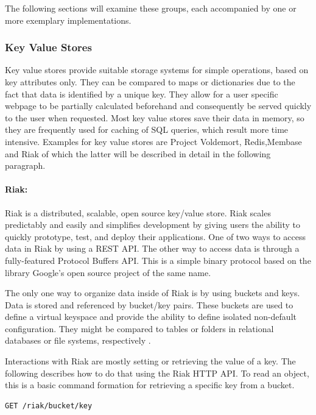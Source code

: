 The following sections will examine these groups, each accompanied by one or more exemplary implementations.      

\subsubsection{Key Value Stores}

Key value stores provide suitable storage systems for simple operations, based on key attributes only. They can be compared to maps or dictionaries due to the fact that data is identified by a unique key. They allow for a user specific webpage to be partially calculated beforehand and consequently be served quickly to the user when requested. Most key value stores save their data in memory, so they are frequently used for caching of \ac{SQL} queries, which result more time intensive. Examples for key value stores are Project Voldemort, Redis,Membase and Riak of which the latter will be described in detail in the following paragraph.

\paragraph{Riak:} Riak is a distributed, scalable, open source key/value store. Riak scales predictably and easily and simplifies development by giving users the ability to quickly prototype, test, and deploy their applications. One of two ways to access data in Riak by using a \ac{REST} \ac{API}. The other way to access data is through a fully-featured Protocol Buffers \ac{API}. This is a simple binary protocol based on the library Google's open source project of the same name.

The only one way to organize data inside of Riak is by using buckets and keys. Data is stored and referenced by bucket/key pairs. These buckets are used to define a virtual keyspace and provide the ability to define isolated non-default configuration. They might be compared to tables or folders in relational databases or file systems, respectively \cite{Riak:Buckets}.

Interactions with Riak are mostly setting or retrieving the value of a key. The following describes how to do that using the Riak \ac{HTTP} \ac{API}. To read an object, this is a basic command formation for retrieving a specific key from a bucket. 

\begin{code}
\begin{verbatim}
GET /riak/bucket/key
\end{verbatim}
\label{lst:riak_get}
\end{code}

